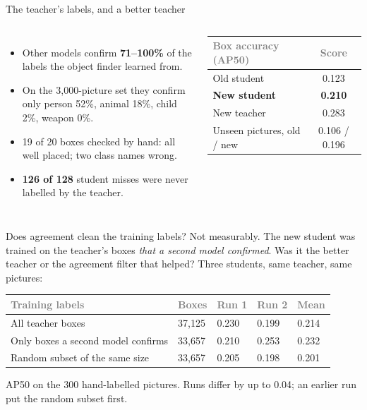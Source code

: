 \documentclass[aspectratio=169,11pt]{beamer}
\newcommand{\h}[1]{\textcolor{grey}{#1}}
\newcommand{\remark}[1]{\par\vspace{0.35cm}{\small\textcolor{grey}{#1}}}
\begin{document}
\begin{frame}{The teacher's labels, and a better teacher}
\begin{columns}[T]
\small
\begin{itemize}\setlength\itemsep{6pt}
  \item Other models confirm \textbf{71--100\%} of the labels the object finder learned from.
  \item On the 3,000-picture set they confirm only person 52\%, animal 18\%, child 2\%, weapon 0\%.
  \item 19 of 20 boxes checked by hand: all well placed; two class names wrong.
  \item \textbf{126 of 128} student misses were never labelled by the teacher.
\end{itemize}
\small
\begin{tabular}{@{}l c@{}}
\toprule
\h{Box accuracy (AP50)} & \h{Score}\\
\midrule
Old student & 0.123\\
\textbf{New student} & \textbf{0.210}\\
New teacher & 0.283\\
\midrule
Unseen pictures, old / new & 0.106 / 0.196\\
\bottomrule
\end{tabular}
\end{columns}
\remark{Biggest gains on classes the old teacher never labelled: building 0.05 $\to$ 0.23, vehicle 0 $\to$ 0.23, child 0.05 $\to$ 0.13.}
\end{frame}

\begin{frame}{Does agreement clean the training labels? Not measurably.}
The new student was trained on the teacher's boxes \emph{that a second model confirmed}. Was it the better teacher or the agreement filter that helped? Three students, same teacher, same pictures:

\vspace{0.3cm}
\begin{tabular}{@{}L{5.4cm} C{1.5cm} C{1.4cm} C{1.4cm} C{1.4cm}@{}}
\toprule
\h{Training labels} & \h{Boxes} & \h{Run 1} & \h{Run 2} & \h{Mean}\\
\midrule
All teacher boxes & 37,125 & 0.230 & 0.199 & 0.214\\
Only boxes a second model confirms & 33,657 & 0.210 & 0.253 & 0.232\\
Random subset of the same size & 33,657 & 0.205 & 0.198 & 0.201\\
\bottomrule
\end{tabular}

\vspace{0.3cm}
AP50 on the 300 hand-labelled pictures. Runs differ by up to 0.04; an earlier run put the random subset first.
\remark{The gain from 0.123 comes from the better teacher. Agreement between models does not pick the better labels.}
\end{frame}
\end{document}
